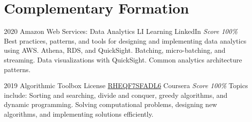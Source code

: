 \documentclass[11pt,a4paper]{moderncv}
\begin{document}
\section{Complementary Formation}


\cventry
    {2020}
    {Amazon Web Services: Data Analytics}
    {LI Learning}
    {LinkedIn}
    {\textit{Score 100\%}}
    {
        Best practices, patterns, and tools for designing                                                         %
        and implementing data analytics using AWS.                                                                %
        Athena, RDS, and QuickSight.                                                                              %
        Batching, micro-batching, and streaming.                                                                  %
        Data visualizations with QuickSight.                                                                      %
        Common analytics architecture patterns.                                                                   %
    }


\cventry
    {2019}
    {Algorithmic Toolbox}
    {License
        \href{https://www.coursera.org/account/accomplishments/verify/RHEQF7SFADL6}
        {RHEQF7SFADL6}
    }
    {Coursera}
    {\textit{Score 100\%}}
    {
        Topics include:                                                                                           %
            Sorting and searching,                                                                                %
            divide and conquer,                                                                                   %
            greedy algorithms,                                                                                    %
            and dynamic programming.                                                                              %
            Solving computational problems,                                                                       %
            designing new algorithms,                                                                             %
            and implementing solutions efficiently.                                                               %
    }
\end{document}
